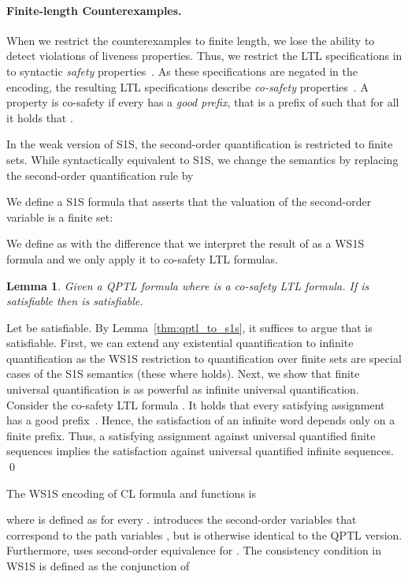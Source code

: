 \documentclass{LMCS}
\theoremstyle{plain}\newtheorem{theorem}[thm]{Theorem}
\theoremstyle{plain}\newtheorem{lemma}[thm]{Lemma}
\theoremstyle{plain}\newtheorem{proposition}[thm]{Proposition}
\theoremstyle{plain}\newtheorem{corollary}[thm]{Corollary}
\theoremstyle{definition}\newtheorem{definition}{Definition}[section]
\begin{document}
\paragraph{\bf Finite-length Counterexamples.}


When we restrict the counterexamples to finite length, we lose the ability to detect violations of liveness properties.
Thus, we restrict the LTL specifications  in  to syntactic \emph{safety} properties~\cite{DBLP:journals/fmsd/KupfermanV01}.
As these specifications are negated in the encoding, the resulting LTL specifications describe \emph{co-safety} properties~\cite{DBLP:journals/fmsd/KupfermanV01}.
A property  is co-safety if every  has a \emph{good prefix}, that is a prefix  of  such that for all  it holds that .

In the weak version of S1S, the second-order quantification is restricted to finite sets.
While syntactically equivalent to S1S, we change the semantics  by replacing the second-order quantification rule by

We define a S1S formula  that asserts that the valuation of the second-order variable  is a finite set:

We define  as  with the difference that we interpret the result of  as a WS1S formula and we only apply it to co-safety LTL formulas.

\begin{lemma} \label{thm:co-safety-ws1s}
Given a QPTL formula  where  is a co-safety LTL formula.
If  is satisfiable then  is satisfiable.
\end{lemma}
\proof
Let  be satisfiable.
By Lemma~\ref{thm:qptl_to_s1s}, it suffices to argue that  is satisfiable.
First, we can extend any existential quantification  to infinite quantification as the WS1S restriction to quantification over finite sets are special cases of the S1S semantics (these where  holds).
Next, we show that finite universal quantification is as powerful as infinite universal quantification.
Consider the co-safety LTL formula .
It holds that every satisfying assignment has a good prefix~\cite{DBLP:journals/fmsd/KupfermanV01}.
Hence, the satisfaction of an infinite word  depends only on a finite prefix.
Thus, a satisfying assignment against universal quantified finite sequences implies the satisfaction against universal quantified infinite sequences.
\qed

\noindent
The WS1S encoding of CL formula  and functions  is

where  is defined as  for every .
 introduces the second-order variables  that correspond to the path variables , but is otherwise identical to the QPTL version.
Furthermore,  uses second-order equivalence  for .
The consistency condition  in WS1S is defined as the conjunction of
\end{document}
